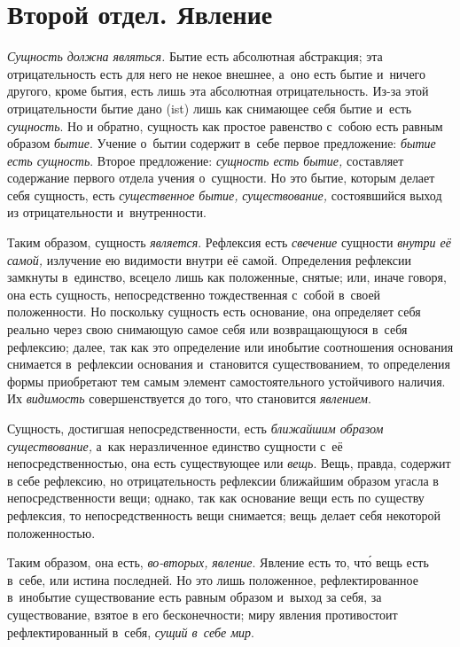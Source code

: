 \part[{\em Второй отдел} Явление]{Второй отдел. Явление}

{\em Сущность должна являться.}
Бытие есть абсолютная абстракция; эта отрицательность есть для него не некое
внешнее, а~оно есть бытие и~ничего другого, кроме бытия, есть лишь эта
абсолютная отрицательность. Из-за этой отрицательности бытие дано (ist)
лишь как снимающее себя бытие и~есть {\em сущность}. Но
и обратно, сущность как простое равенство с~собою есть равным образом
{\em бытие}. Учение о~бытии содержит в~себе первое
предложение: {\em бытие есть сущность}. Второе
предложение: {\em сущность есть бытие,} составляет
содержание первого отдела учения о~сущности. Но это бытие, которым делает
себя сущность, есть {\em существенное бытие,}
{\em существование,} состоявшийся выход из
отрицательности и~внутренности.

Таким образом, сущность {\em является}. Рефлексия есть
{\em свечение} сущности {\em внутри
её самой,} излучение ею видимости внутри её самой. Определения рефлексии
замкнуты в~единство, всецело лишь как положенные, снятые; или, иначе
говоря, она есть сущность, непосредственно тождественная с~собой в~своей
положенности. Но поскольку сущность есть основание, она определяет себя
реально через свою снимающую самое себя или возвращающуюся в~себя
рефлексию; далее, так как это определение или инобытие соотношения
основания снимается в~рефлексии основания и~становится существованием, то
определения формы приобретают тем самым элемент самостоятельного
устойчивого наличия. Их {\em видимость}
совершенствуется до того, что становится {\em явлением}.

Сущность, достигшая непосредственности, есть
{\em ближайшим образом существование,} а~как
неразличенное единство сущности с~её непосредственностью, она есть
существующее или {\em вещь}. Вещь, правда, содержит в
себе рефлексию, но отрицательность рефлексии ближайшим образом угасла в
непосредственности вещи; однако, так как основание вещи есть по существу
рефлексия, то непосредственность вещи снимается; вещь делает себя некоторой
положенностью.

Таким образом, она есть, {\em во-вторых,}
{\em явление}. Явление есть то, чт\'{о} вещь есть в~себе,
или истина последней. Но это лишь положенное, рефлектированное в~инобытие
существование есть равным образом и~выход за себя, за существование, взятое
в его бесконечности; миру явления противостоит рефлектированный в~себя,
{\em сущий в~себе мир}.

